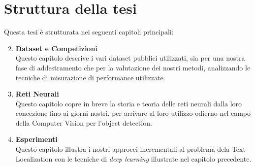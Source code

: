 \section{Struttura della tesi}
Questa tesi è strutturata nei seguenti capitoli principali:
\begin{enumerate}
\setcounter{enumi}{1}
	\item \textbf{Dataset e Competizioni} \\
		Questo capitolo descrive i vari dataset pubblici utilizzati, sia per una nostra fase di addestramento che per la valutazione dei nostri metodi, analizzando le tecniche di misurazione di performance utilizzate. 
	\item \textbf{Reti Neurali} \\
		Questo capitolo copre in breve la storia e teoria delle reti neurali dalla loro concezione fino ai giorni nostri, per arrivare al loro utilizzo odierno nel campo della Computer Vision per l'object detection.
	\item \textbf{Esperimenti} \\
		Questo capitolo illustra i nostri approcci incrementali al problema dela Text Localization con le tecniche di \textit{deep learning} illustrate nel capitolo precedente.
	\end{enumerate}

